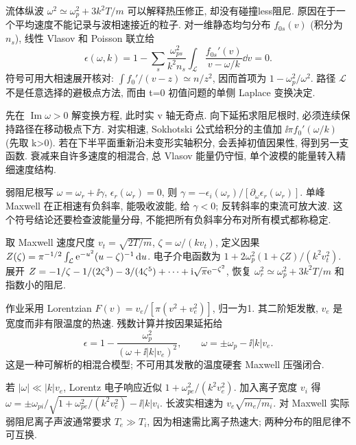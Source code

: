 \label{ch:landau}
流体纵波 $\omega^2\simeq\omega_p^2+3k^2T/m$ 可以解释热压修正, 却没有碰撞less阻尼. 原因在于一个平均速度不能记录与波相速接近的粒子. 对一维静态均匀分布 $f_{0s}(v)$ (积分为 $n_s$), 线性 Vlasov 和 Poisson 联立给
\begin{equation}
 \epsilon(\omega,k)=1-\sum_s\frac{\omega_{ps}^2}{k^2n_s}
 \int_{\mathcal L}\frac{f_{0s}'(v)}{v-\omega/k}\dd v=0.
\end{equation}
符号可用大相速展开核对: $\int f_0'/(v-z)\simeq n/z^2$, 因而首项为 $1-\omega_p^2/\omega^2$. 路径 $\mathcal L$ 不是任意选择的避极点方法, 而由 t=0 初值问题的单侧 Laplace 变换决定.

先在 $\operatorname{Im}\omega>0$ 解变换方程, 此时实 v 轴无奇点. 向下延拓求阻尼根时, 必须连续保持路径在移动极点下方. 对实相速, Sokhotski 公式给积分的主值加 $\ii\pi f_0'(\omega/k)$ (先取 k>0). 若在下半平面重新沿未变形实轴积分, 会丢掉初值因果性, 得到另一支函数. 衰减来自许多速度的相混合, 总 Vlasov 能量仍守恒, 单个波模的能量转入精细速度结构.

弱阻尼根写 $\omega=\omega_r+\ii\gamma$, $\epsilon_r(\omega_r)=0$, 则
$\gamma=-\epsilon_i(\omega_r)/[\partial_\omega\epsilon_r(\omega_r)]$.
单峰 Maxwell 在正相速有负斜率, 能吸收波能, 给 $\gamma<0$; 反转斜率的束流可放大波. 这个符号结论还要检查波能量分母, 不能把所有负斜率分布对所有模式都称稳定.

取 Maxwell 速度尺度 $v_t=\sqrt{2T/m}$, $\zeta=\omega/(kv_t)$, 定义因果 $Z(\zeta)=\pi^{-1/2}\int_{\mathcal L}\mathrm e^{-u^2}(u-\zeta)^{-1}\,\mathrm d u$. 电子介电函数为 $1+2\omega_p^2(1+\zeta Z)/(k^2v_t^2)$. 展开 $Z=-1/\zeta-1/(2\zeta^3)-3/(4\zeta^5)+\cdots+\mathrm i\sqrt\pi\mathrm e^{-\zeta^2}$, 恢复 $\omega_r^2\simeq\omega_p^2+3k^2T/m$ 和指数小的阻尼.

作业采用 Lorentzian $F(v)=v_e/[\pi(v^2+v_e^2)]$, 归一为1. 其二阶矩发散, $v_e$ 是宽度而非有限温度的热速. 残数计算并按因果延拓给
\begin{equation}
 \epsilon=1-\frac{\omega_p^2}{(\omega+\ii|k|v_e)^2},\qquad
 \omega=\pm\omega_p-\ii|k|v_e.
\end{equation}
这是一种可解析的相混合模型; 不可用其发散的温度硬套 Maxwell 压强闭合.

若 $|\omega|\ll|k|v_e$, Lorentz 电子响应近似 $1+\omega_{pe}^2/(k^2v_e^2)$. 加入离子宽度 $v_i$ 得
$\omega=\pm\omega_{pi}/\sqrt{1+\omega_{pe}^2/(k^2v_e^2)}-\ii|k|v_i$.
长波实相速为 $v_e\sqrt{m_e/m_i}$. 对 Maxwell 实际弱阻尼离子声波通常要求 $T_e\gg T_i$, 因为相速需比离子热速大; 两种分布的阻尼律不可互换.

